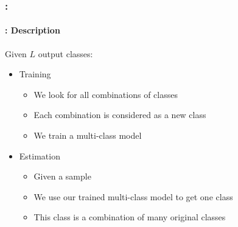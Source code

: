 \documentclass[xcolor=table]{beamer}
\begin{document}
\begin{frame}
	\frametitle{\insertshortsubtitle: \insertsection}
	\framesubtitle{\insertsubsection: Description}
	
	Given $L$ output classes:
	\begin{itemize}
		\item Training
		\begin{itemize}
			\item We look for all combinations of classes
			\item Each combination is considered as a new class
			\item We train a multi-class model
		\end{itemize}
		\item Estimation
		\begin{itemize}
			\item Given a sample
			\item We use our trained multi-class model to get one class
			\item This class is a combination of many original classes
		\end{itemize}
	\end{itemize}
	
\end{frame}

\end{document}
